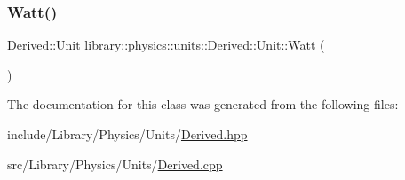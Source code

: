 \subsubsection{\texorpdfstring{Watt()}{Watt()}}
{\footnotesize\ttfamily \hyperlink{classlibrary_1_1physics_1_1units_1_1_derived_1_1_unit}{Derived\+::\+Unit} library\+::physics\+::units\+::\+Derived\+::\+Unit\+::\+Watt (\begin{DoxyParamCaption}{ }\end{DoxyParamCaption})\hspace{0.3cm}{\ttfamily [static]}}



The documentation for this class was generated from the following files\+:\begin{DoxyCompactItemize}
\item 
include/\+Library/\+Physics/\+Units/\hyperlink{_derived_8hpp}{Derived.\+hpp}\item 
src/\+Library/\+Physics/\+Units/\hyperlink{_derived_8cpp}{Derived.\+cpp}\end{DoxyCompactItemize}

